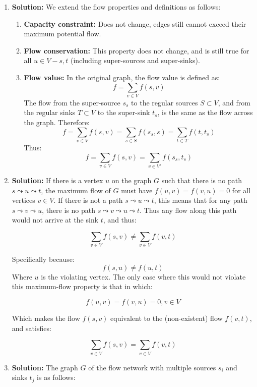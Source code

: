 \documentclass{article}
\begin{document}
\begin{enumerate}
    \item \textbf{Solution:}
    We extend the flow properties and definitions as follows:
    \begin{enumerate}
        \item \textbf{Capacity constraint:} Does not change, edges still cannot
        exceed their maximum potential flow.
        \item \textbf{Flow conservation:} This property does not change, and is
        still true for all $u \in V - {s, t}$ (including super-sources and
        super-sinks).
        \item \textbf{Flow value:} In the original graph, the flow value is
        defined as:
        $$ f = \displaystyle\sum_{v\in V} f(s,v) $$
        The flow from the super-source $s_{s}$ to the regular sources $S \subset
        V$, and from the regular sinks $T \subset V$ to the super-sink $t_{s}$,
        is the same as the flow across the graph. Therefore:
        $$ f = \displaystyle\sum_{v\in V} f(s,v) = \displaystyle\sum_{s\in S}
        f(s_{s},s) = \displaystyle\sum_{t\in T} f(t,t_{s}) $$
        Thus:
        $$ f = \displaystyle\sum_{v\in V} f(s,v) = \displaystyle\sum_{v\in V'}
        f(s_{s}, t_{s}) $$
    \end{enumerate}
    \item \textbf{Solution:}
    If there is a vertex $u$ on the graph $G$ such that there is no path $s
    \leadsto u \leadsto t$, the maximum flow of $G$ must have $f(u,v) = f(v,u) =
    0$ for all vertices $v\in V$. If there is not a path $s \leadsto u \leadsto
    t$, this means that for any path $s \leadsto v \leadsto u$, there is no
    path $s \leadsto v \leadsto u \leadsto t$. Thus any flow along this path
    would not arrive at the sink $t$, and thus:

    $$ \displaystyle\sum_{v\in V} f(s,v) \neq \displaystyle\sum_{v\in V} f(v,t)
    $$

    Specifically because:
    $$ f(s,u) \neq f(u,t) $$
    Where $u$ is the violating vertex. The only case where this would not
    violate this maximum-flow property is that in which:

    $$ f(u,v) = f(v,u) = 0, v\in V $$

    Which makes the flow $f(s,v)$ equivalent to the (non-existent) flow
    $f(v,t)$, and satisfies:

    $$ \displaystyle\sum_{v\in V} f(s,v) = \displaystyle\sum_{v\in V} f(v,t) $$

    \item \textbf{Solution:}
    The graph $G$ of the flow network with multiple sources $s_{i}$ and sinks
    $t_{j}$ is as follows:


\end{enumerate}
\end{document}
